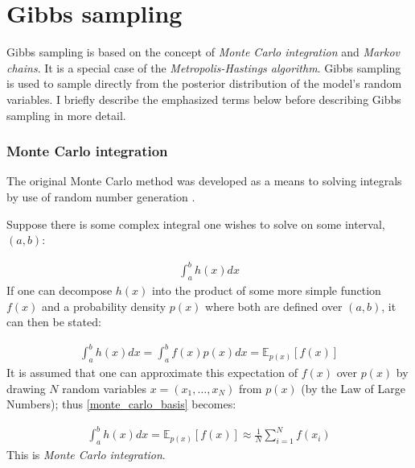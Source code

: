 \documentclass[12pt]{article} %
\begin{document}
	\newpage



%	
	
%	
	
%	
	
	

\newpage

\appendix

\section{Gibbs sampling} \label{sec:additional_theory:sub_sec:gibbs_sampler}
Gibbs sampling is based on the concept of \emph{Monte Carlo integration} and \emph{Markov chains}. It is a special case of the \emph{Metropolis-Hastings algorithm}. Gibbs sampling is used to sample directly from the posterior distribution of the model's random variables. I briefly describe the emphasized terms below before describing Gibbs sampling in more detail.

\subsubsection{Monte Carlo integration}
The original Monte Carlo method was developed as a means to solving integrals by use of random number generation \citep{MetropolisMonteCarloMethod1949}.

Suppose there is some complex integral one wishes to solve on some interval, $(a,b)$:

\begin{align}
\int_a^b h(x) dx
\end{align}
If one can decompose $h(x)$ into the product of some more simple function $f(x)$ and a probability density $p(x)$ where both are defined over $(a,b)$, it can then be stated:

\begin{align} \label{monte_carlo_basis}
\int_a^bh(x)dx = \int_a^bf(x)p(x)dx = \mathbb{E}_{p(x)}\left[f(x)\right]
\end{align}
It is assumed that one can approximate this expectation of $f(x)$ over $p(x)$ by drawing $N$ random variables $x = (x_1,\ldots,x_N)$ from $p(x)$ (by the Law of Large Numbers); thus \eqref{monte_carlo_basis} becomes:

\begin{align} \label{monte_carlo_integration}
\int_a^bh(x)dx = \mathbb{E}_{p(x)}\left[f(x)\right] \approx \frac{1}{N}\sum_{i=1}^Nf(x_i)
\end{align}
This is \emph{Monte Carlo integration}.
\end{document}
